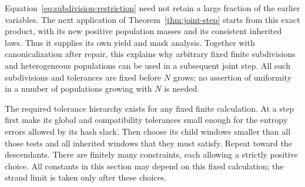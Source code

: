 Equation~\eqref{eq:subdivision-restriction} need not retain a large
fraction of the earlier variables.  The next application of
Theorem~\ref{thm:joint-step} starts from this exact product, with its
new positive population masses and its consistent inherited laws.
Thus it supplies its own yield and mask analysis.  Together with
canonicalization after repair, this explains why arbitrary fixed
finite subdivisions and heterogeneous populations can be used in a
subsequent joint step.  All such subdivisions and tolerances are fixed
before $N$ grows; no assertion of uniformity in a number of populations
growing with $N$ is needed.

The required tolerance hierarchy exists for any fixed finite
calculation.  At a step first make its global and compatibility
tolerances small enough for the entropy errors allowed by its hash
slack.  Then choose its child windows smaller than all those tests and
all inherited windows that they must satisfy.  Repeat toward the
descendants.  There are finitely many constraints, each allowing a
strictly positive choice.  All constants in this section may depend
on this fixed calculation; the strand limit is taken only after these
choices.
